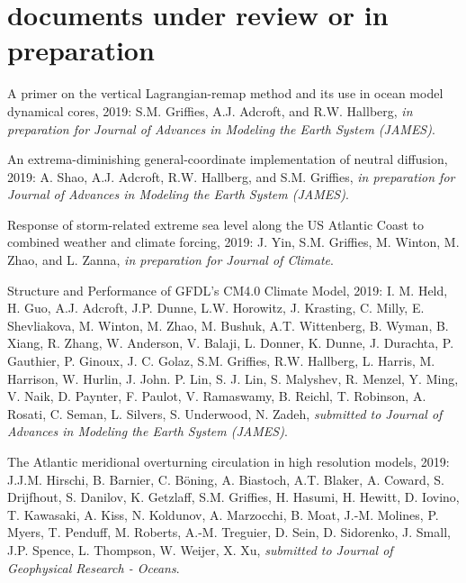 \section*{\sc \color{Maroon} documents under review or in preparation}

\small 


\begin{etaremune}

\item A primer on the vertical Lagrangian-remap method and its use in ocean model dynamical cores, 2019: S.M. Grif\/f\/ies, A.J. Adcroft, and R.W. Hallberg, {\it in preparation for Journal of Advances in Modeling the Earth System (JAMES)}.

\item An extrema-diminishing general-coordinate implementation of neutral diffusion, 2019: A. Shao, A.J. Adcroft, R.W. Hallberg, and S.M. Grif\/f\/ies, {\it in preparation for Journal of Advances in Modeling the Earth System (JAMES)}.

\item Response of storm-related extreme sea level along the US Atlantic Coast to combined weather and climate forcing, 2019: J. Yin, S.M. Grif\/f\/ies, M. Winton, M. Zhao, and L. Zanna, {\it in preparation for Journal of Climate}. 

\item Structure and Performance of GFDL's CM4.0 Climate Model, 2019: I. M. Held, H. Guo, A.J. Adcroft, J.P. Dunne, L.W. Horowitz, J. Krasting, C. Milly, E. Shevliakova, M. Winton, M. Zhao, M. Bushuk, A.T. Wittenberg, B. Wyman, B. Xiang, R. Zhang, W. Anderson, V. Balaji, L. Donner, K. Dunne, J. Durachta, P. Gauthier, P. Ginoux, J. C. Golaz, S.M. Griffies, R.W. Hallberg, L.  Harris, M. Harrison, W. Hurlin, J. John. P. Lin, S. J. Lin, S. Malyshev, R. Menzel, Y. Ming, V. Naik, D. Paynter, F. Paulot, V. Ramaswamy, B. Reichl, T. Robinson, A. Rosati, C. Seman, L. Silvers, S. Underwood, N. Zadeh, {\it submitted to Journal of Advances in Modeling the Earth System (JAMES)}.

\item The Atlantic meridional overturning circulation in high resolution models, 2019: J.J.M. Hirschi, B. Barnier, C. {B\"{o}ning}, A. Biastoch, A.T. Blaker, A. Coward, S. Drijfhout, S. Danilov, K. Getzlaff, S.M. Grif\/f\/ies, H. Hasumi, H. Hewitt, D. Iovino, T. Kawasaki, A. Kiss, N. Koldunov, A. Marzocchi, B. Moat, J.-M. Molines, P. Myers, T. Penduff, M. Roberts, A.-M. Treguier, D. Sein, D. Sidorenko, J. Small, J.P. Spence, L. Thompson, W. Weijer, X. Xu, {\it submitted to Journal of Geophysical Research - Oceans}. 


\end{etaremune}
